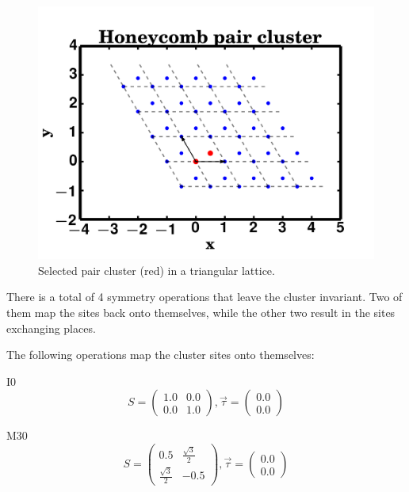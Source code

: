 \documentclass[12pt, fleqn]{article}
\begin{document}
\begin{figure}[h]
    \begin{center}
        \includegraphics[max width=\textwidth]{./honeyclust.png}
    \end{center}
    \caption{Selected pair cluster (red) in a triangular lattice.}
    \label{fig:honeyclust}
\end{figure}

There is a total of 4 symmetry operations that leave the cluster invariant. Two of them
map the sites back onto themselves, while the other two result in the sites exchanging places.

\noindent
The following operations map the cluster sites onto themselves:

I0
\begin{equation}
    S=
    \begin{pmatrix}
        1.0&0.0\\
        0.0&1.0
    \end{pmatrix}
    ,\vec{\tau}=
    \begin{pmatrix}
        0.0\\
        0.0
    \end{pmatrix}
    \label{I0}
\end{equation}

M30
\begin{equation}
    S=
    \begin{pmatrix}
        0.5&\frac{\sqrt{3}}{2}\\
        \frac{\sqrt{3}}{2}&-0.5
    \end{pmatrix}
    ,\vec{\tau}=
    \begin{pmatrix}
        0.0\\
        0.0
    \end{pmatrix}
    \label{M30}
\end{equation}
\end{document}
